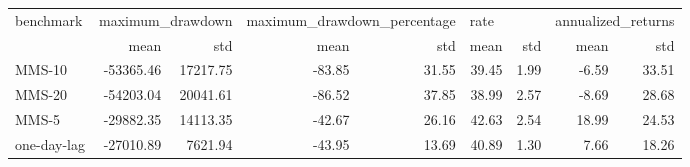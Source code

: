 \begin{tabular}{lrrrrrrrr}
\toprule
  benchmark & \multicolumn{2}{l}{maximum\_drawdown} & \multicolumn{2}{l}{maximum\_drawdown\_percentage} & \multicolumn{2}{l}{rate} & \multicolumn{2}{l}{annualized\_returns} \\
            &             mean &      std &                        mean &   std &  mean &  std &               mean &   std \\
\midrule
      MMS-10 &        -53365.46 & 17217.75 &                      -83.85 & 31.55 & 39.45 & 1.99 &              -6.59 & 33.51 \\
      MMS-20 &        -54203.04 & 20041.61 &                      -86.52 & 37.85 & 38.99 & 2.57 &              -8.69 & 28.68 \\
        MMS-5 &        -29882.35 & 14113.35 &                      -42.67 & 26.16 & 42.63 & 2.54 &              18.99 & 24.53 \\
  one-day-lag &        -27010.89 &  7621.94 &                      -43.95 & 13.69 & 40.89 & 1.30 &               7.66 & 18.26 \\
\bottomrule
\end{tabular}
